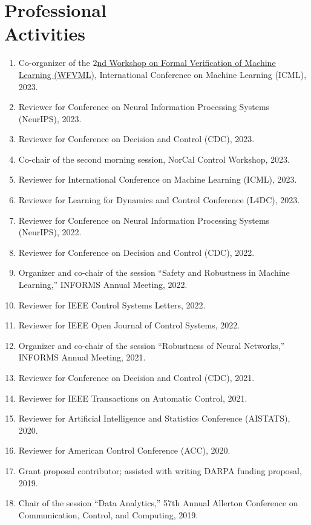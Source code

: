 \documentclass[11pt]{article}
\begin{document}
	\section{\texorpdfstring{Professional \\[\baselineskip] Activities}{Professional Activities}}
	\hfill\vspace*{-2\baselineskip}
	\begin{enumerate}[label={\arabic*.}]
		\item Co-organizer of the \href{https://www.ml-verification.com/}{$2$nd Workshop on Formal Verification of Machine Learning (WFVML)}, International Conference on Machine Learning (ICML), 2023.
		\item Reviewer for Conference on Neural Information Processing Systems (NeurIPS), 2023.
		\item Reviewer for Conference on Decision and Control (CDC), 2023.
		\item Co-chair of the second morning session, NorCal Control Workshop, 2023.
		\item Reviewer for International Conference on Machine Learning (ICML), 2023.
		\item Reviewer for Learning for Dynamics and Control Conference (L4DC), 2023.
		\item Reviewer for Conference on Neural Information Processing Systems (NeurIPS), 2022.
		\item Reviewer for Conference on Decision and Control (CDC), 2022.
		\item Organizer and co-chair of the session ``Safety and Robustness in Machine Learning,'' INFORMS Annual Meeting, 2022.
		\item Reviewer for IEEE Control Systems Letters, 2022.
		\item Reviewer for IEEE Open Journal of Control Systems, 2022.
		\item Organizer and co-chair of the session ``Robustness of Neural Networks,'' INFORMS Annual Meeting, 2021.
		\item Reviewer for Conference on Decision and Control (CDC), 2021.
		\item Reviewer for IEEE Transactions on Automatic Control, 2021.
		\item Reviewer for Artificial Intelligence and Statistics Conference (AISTATS), 2020.
		\item Reviewer for American Control Conference (ACC), 2020.
		\item Grant proposal contributor; assisted with writing DARPA funding proposal, 2019.
		\item Chair of the session ``Data Analytics,'' 57th Annual Allerton Conference on Communication, Control, and Computing, 2019.
	\end{enumerate}
	
\end{document}
